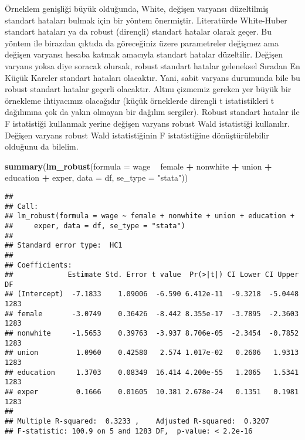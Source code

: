 \documentclass[
]{book}
\newenvironment{Shaded}{\begin{snugshade}}{\end{snugshade}}
\newcommand{\DataTypeTok}[1]{\textcolor[rgb]{0.13,0.29,0.53}{#1}}
\newcommand{\KeywordTok}[1]{\textcolor[rgb]{0.13,0.29,0.53}{\textbf{#1}}}
\newcommand{\NormalTok}[1]{#1}
\newcommand{\OperatorTok}[1]{\textcolor[rgb]{0.81,0.36,0.00}{\textbf{#1}}}
\newcommand{\StringTok}[1]{\textcolor[rgb]{0.31,0.60,0.02}{#1}}
\begin{document}
Örneklem genişliği büyük olduğunda, White, değişen varyansı düzeltilmiş standart hataları bulmak için bir yöntem önermiştir. Literatürde White-Huber standart hataları ya da robust (dirençli) standart hatalar olarak geçer. Bu yöntem ile birazdan çıktıda da göreceğiniz üzere parametreler değişmez ama değişen varyansı hesaba katmak amacıyla standart hatalar düzeltilir. Değişen varyans yoksa diye soracak olursak, robust standart hatalar geleneksel Sıradan En Küçük Kareler standart hataları olacaktır. Yani, sabit varyans durumunda bile bu robust standart hatalar geçerli olacaktır. Altını çizmemiz gereken yer büyük bir örnekleme ihtiyacımız olacağıdır (küçük örneklerde dirençli t istatistikleri t dağılımına çok da yakın olmayan bir dağılım sergiler). Robust standart hatalar ile F istatistiği kullanmak yerine değişen varyans robust Wald istatistiği kullanılır. Değişen varyans robust Wald istatistiğinin F istatistiğine dönüştürülebilir olduğunu da bilelim.

\begin{Shaded}
\begin{Highlighting}[]
\KeywordTok{summary}\NormalTok{(}\KeywordTok{lm_robust}\NormalTok{(}\DataTypeTok{formula =}\NormalTok{ wage }\OperatorTok{~}\StringTok{ }\NormalTok{female }\OperatorTok{+}\StringTok{ }\NormalTok{nonwhite }\OperatorTok{+}\StringTok{ }\NormalTok{union }\OperatorTok{+}\StringTok{ }\NormalTok{education }\OperatorTok{+}\StringTok{ }\NormalTok{exper, }\DataTypeTok{data =}\NormalTok{ df, }\DataTypeTok{se_type =} \StringTok{"stata"}\NormalTok{))}
\end{Highlighting}
\end{Shaded}

\begin{verbatim}
## 
## Call:
## lm_robust(formula = wage ~ female + nonwhite + union + education + 
##     exper, data = df, se_type = "stata")
## 
## Standard error type:  HC1 
## 
## Coefficients:
##             Estimate Std. Error t value  Pr(>|t|) CI Lower CI Upper   DF
## (Intercept)  -7.1833    1.09006  -6.590 6.412e-11  -9.3218  -5.0448 1283
## female       -3.0749    0.36426  -8.442 8.355e-17  -3.7895  -2.3603 1283
## nonwhite     -1.5653    0.39763  -3.937 8.706e-05  -2.3454  -0.7852 1283
## union         1.0960    0.42580   2.574 1.017e-02   0.2606   1.9313 1283
## education     1.3703    0.08349  16.414 4.200e-55   1.2065   1.5341 1283
## exper         0.1666    0.01605  10.381 2.678e-24   0.1351   0.1981 1283
## 
## Multiple R-squared:  0.3233 ,    Adjusted R-squared:  0.3207 
## F-statistic: 100.9 on 5 and 1283 DF,  p-value: < 2.2e-16
\end{verbatim}
\end{document}
